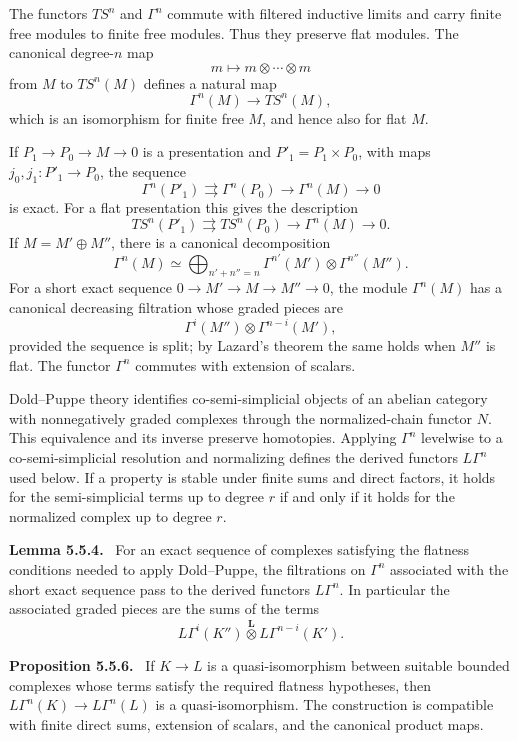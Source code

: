 \documentclass[12pt]{article}
\newcommand{\otimesL}{\mathbin{\overset{\mathbf L}{\otimes}}}
\newenvironment{statement}[1]{\par\medskip\noindent\textbf{#1.}\ }{\par\medskip}
\begin{document}
The functors \(TS^n\) and \(\Gamma^n\) commute with filtered inductive limits and carry finite free modules to finite free modules. Thus they preserve flat modules. The canonical degree-\(n\) map
\[
m\longmapsto m\otimes\cdots\otimes m
\]
from \(M\) to \(TS^n(M)\) defines a natural map
\[
\Gamma^n(M)\longrightarrow TS^n(M),
\]
which is an isomorphism for finite free \(M\), and hence also for flat \(M\).

If \(P_1\to P_0\to M\to0\) is a presentation and \(P'_1=P_1\times P_0\), with maps \(j_0,j_1:P'_1\to P_0\), the sequence
\[
\Gamma^n(P'_1)\rightrightarrows\Gamma^n(P_0)\longrightarrow\Gamma^n(M)\longrightarrow0
\]
is exact. For a flat presentation this gives the description
\[
TS^n(P'_1)\rightrightarrows TS^n(P_0)\longrightarrow\Gamma^n(M)\longrightarrow0.
\]
If \(M=M'\oplus M''\), there is a canonical decomposition
\[
\Gamma^n(M)\simeq\bigoplus_{n'+n''=n}\Gamma^{n'}(M')\otimes\Gamma^{n''}(M'').
\]
For a short exact sequence \(0\to M'\to M\to M''\to0\), the module \(\Gamma^n(M)\) has a canonical decreasing filtration whose graded pieces are
\[
\Gamma^i(M'')\otimes\Gamma^{n-i}(M'),
\]
provided the sequence is split; by Lazard's theorem the same holds when \(M''\) is flat. The functor \(\Gamma^n\) commutes with extension of scalars.

Dold--Puppe theory identifies co-semi-simplicial objects of an abelian category with nonnegatively graded complexes through the normalized-chain functor \(N\). This equivalence and its inverse preserve homotopies. Applying \(\Gamma^n\) levelwise to a co-semi-simplicial resolution and normalizing defines the derived functors \(L\Gamma^n\) used below. If a property is stable under finite sums and direct factors, it holds for the semi-simplicial terms up to degree \(r\) if and only if it holds for the normalized complex up to degree \(r\).

\begin{statement}{Lemma 5.5.4}
For an exact sequence of complexes satisfying the flatness conditions needed to apply Dold--Puppe, the filtrations on \(\Gamma^n\) associated with the short exact sequence pass to the derived functors \(L\Gamma^n\). In particular the associated graded pieces are the sums of the terms
\[
L\Gamma^i(K'')\otimesL L\Gamma^{n-i}(K').
\]
\end{statement}

\begin{statement}{Proposition 5.5.6}
If \(K\to L\) is a quasi-isomorphism between suitable bounded complexes whose terms satisfy the required flatness hypotheses, then \(L\Gamma^n(K)\to L\Gamma^n(L)\) is a quasi-isomorphism. The construction is compatible with finite direct sums, extension of scalars, and the canonical product maps.
\end{statement}
\end{document}
